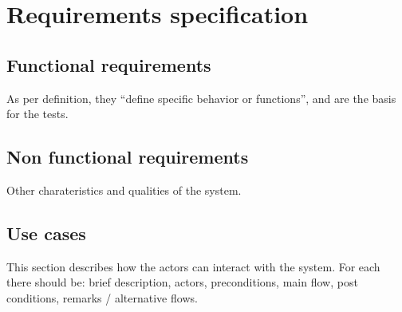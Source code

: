 \section{Requirements specification}\label{sec:reqs}



\subsection{Functional requirements}\label{subsec:req_func}
As per definition, they ``define specific behavior or functions'', and are the basis for the tests.

\subsection{Non functional requirements}\label{subsec:req_nf}
Other charateristics and qualities of the system.

\subsection{Use cases}\label{subsec:u_cases}
This section describes how the actors can interact with the system.
For each there should be: brief description, actors, preconditions, main flow, post conditions, remarks / alternative flows.
